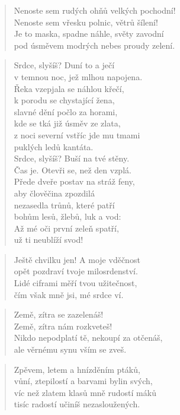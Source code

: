 \documentclass{book}
\begin{document}
\begin{verse}
Nenoste sem rudých ohňů velkých pochodní!\\
Nenoste sem vřesku polnic, větrů šílení!\\
Je to maska, spadne náhle, světy zavodní\\
pod úsměvem modrých nebes proudy zelení.
\end{verse}
\newpage
{}
\begin{verse}
Srdce, slyšíš? Duní to a ječí\\
v temnou noc, jež mlhou napojena.\\
Řeka vzepjala se náhlou křečí,\\
k porodu se chystající žena,\\
slavné dění počlo za horami,\\
kde se tká již úsměv ze zlata,\\
z noci severní vstříc jde mu tmami\\
puklých ledů kantáta.\\
Srdce, slyšíš? Buší na tvé stěny.\\
Čas je. Otevři se, než den vzplá.\\
Přede dveře postav na stráž feny,\\
aby člověčina zpozdilá\\
nezasedla trůnů, které patří\\
bohům lesů, žlebů, luk a vod:\\
Až mé oči první zeleň spatří,\\
už ti neublíží svod!
\end{verse}
\newpage
{}
\begin{verse}
Ještě chvilku jen! A moje vděčnost\\
opět pozdraví tvoje milosrdenství.\\
Lidé ciframi měří tvou užitečnost,\\
čím však mně jsi, mé srdce ví.
\end{verse}
\begin{verse}
Země, zítra se zazelenáš!\\
Země, zítra nám rozkveteš!\\
Nikdo nepodplatí tě, nekoupí za otčenáš,\\
ale věrnému synu vším se zveš.
\end{verse}
\begin{verse}
Zpěvem, letem a hnízděním ptáků,\\
vůní, ztepilostí a barvami bylin svých,\\
víc než zlatem klasů mně rudostí máků\\
tisíc radostí učiníš nezasloužených.
\end{verse}
\end{document}
